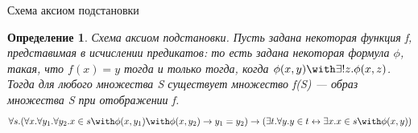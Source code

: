 \documentclass[aspectratio=169]{beamer}
\newtheorem{dfn}{Определение}[section]
\begin{document}
\begin{frame}{Схема аксиом подстановки}
\begin{dfn}Схема аксиом подстановки. 
Пусть задана некоторая функция f, представимая в исчислении предикатов:
то есть задана некоторая формула $\phi$, такая, что $f(x) = y$
тогда и только тогда, когда $\phi(x,y) \with \exists ! z. \phi(x,z)$.
Тогда для любого множества S существует множество f(S) --- образ
множества S при отображении f.
$$\forall s .(\forall x .\forall y_1 .\forall y_2 .x \in s \with \phi (x,y_1) \with \phi
(x,y_2) \rightarrow y_1=y_2) \rightarrow 
(\exists t .\forall y .y \in t
\leftrightarrow \exists x . x \in s \with \phi (x,y)) $$
\end{dfn}
\end{frame}
\end{document}
